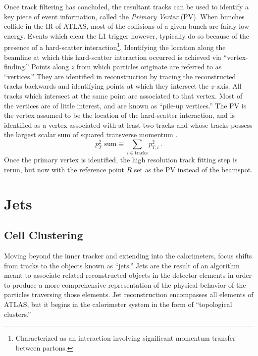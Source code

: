             Once track filtering has concluded,
                the resultant tracks can be used to identify a key piece of event information, 
                called the \textit{Primary Vertex} (PV).
            When bunches collide in the IR of ATLAS, most of the collisions of a given bunch are fairly low energy.
            Events which clear the L1 trigger however,
                typically do so because of the presence of a hard-scatter interaction\footnote{
                    Characterized as an interaction involving significant momentum transfer between partons.
                }.
            Identifying the location along the beamline at which this hard-scatter interaction occurred is achieved via ``vertex-finding.''
            Points along $z$ from which particles originate are referred to as ``vertices.''
            They are identified in reconstruction by tracing the reconstructed tracks backwards
                and identifying points at which they intersect the $z$-axis.
            All tracks which intersect at the same point are associated to that vertex.
            Most of the vertices are of little interest, and are known as ``pile-up vertices.''
            The PV is the vertex assumed to be the location of the hard-scatter interaction,
                and is identified as a vertex associated with at least two tracks
                and whose tracks possess the largest scalar sum of squared transverse momentum
                    \cite{jet_energy_scale13TeV} \cite{primary_vertex_identification}.
                \begin{equation}
                    p_T^2 \textrm{ sum}  \equiv \sum\limits_{i \in \textrm{tracks}} p_{T,i}^2
                    \,.
                \end{equation}
            Once the primary vertex is identified, the high resolution track fitting step is rerun,
                but now with the reference point $R$ set as the PV instead of the beamspot.


    \FloatBarrier
    \section{Jets}\label{sec:jets}

        \subsection{Cell Clustering}

        Moving beyond the inner tracker and extending into the calorimeters,
            focus shifts from tracks to the objects known as ``jets.''
        Jets are the result of an algorithm meant to associate related reconstructed objects in the detector elements
            in order to produce a more comprehensive representation of the physical behavior of the particles traversing those elements.
        Jet reconstruction encompasses all elements of ATLAS,
            but it begins in the calorimeter system in the form of ``topological clusters.''

